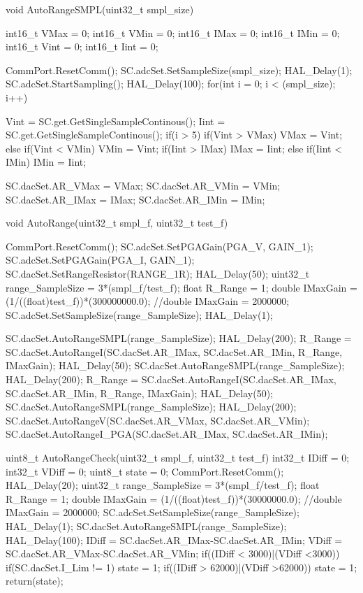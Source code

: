 void AutoRangeSMPL(uint32_t smpl_size) {
	  int16_t VMax = 0;
	  int16_t VMin = 0;
	  int16_t IMax = 0;
	  int16_t IMin = 0;
	  int16_t Vint = 0;
	  int16_t Iint = 0;

	  CommPort.ResetComm();
	  SC.adcSet.SetSampleSize(smpl_size);
	  HAL_Delay(1);
	  SC.adcSet.StartSampling();
	  HAL_Delay(100);
	  for(int i = 0; i < (smpl_size); i++) {
		  Vint = SC.get.GetSingleSampleContinous();
		  Iint = SC.get.GetSingleSampleContinous();
		  if(i > 5) {
			  if(Vint > VMax) {
				  VMax = Vint;
			  }
			  else if(Vint < VMin) {
				  VMin = Vint;
			  }
			  if(Iint > IMax) {
				  IMax = Iint;
			  }
			  else if(Iint < IMin) {
				  IMin = Iint;
			  }
		  }

	  }
	  SC.dacSet.AR_VMax = VMax;
	  SC.dacSet.AR_VMin = VMin;
	  SC.dacSet.AR_IMax = IMax;
	  SC.dacSet.AR_IMin = IMin;


}

void AutoRange(uint32_t smpl_f, uint32_t test_f) {
	  CommPort.ResetComm();
	  SC.adcSet.SetPGAGain(PGA_V, GAIN_1);
	  SC.adcSet.SetPGAGain(PGA_I, GAIN_1);
	  SC.dacSet.SetRangeResistor(RANGE_1R);
	  HAL_Delay(50);
	  uint32_t range_SampleSize = 3*(smpl_f/test_f);
	  float R_Range = 1;
	  double IMaxGain = (1/((float)test_f))*(300000000.0);
	  //double IMaxGain = 2000000;
	  SC.adcSet.SetSampleSize(range_SampleSize);
	  HAL_Delay(1);

	  SC.dacSet.AutoRangeSMPL(range_SampleSize);
	  HAL_Delay(200);
	  R_Range = SC.dacSet.AutoRangeI(SC.dacSet.AR_IMax, SC.dacSet.AR_IMin, R_Range, IMaxGain);
	  HAL_Delay(50);
	  SC.dacSet.AutoRangeSMPL(range_SampleSize);
	  HAL_Delay(200);
	  R_Range = SC.dacSet.AutoRangeI(SC.dacSet.AR_IMax, SC.dacSet.AR_IMin, R_Range, IMaxGain);
	  HAL_Delay(50);
	  SC.dacSet.AutoRangeSMPL(range_SampleSize);
	  HAL_Delay(200);
	  SC.dacSet.AutoRangeV(SC.dacSet.AR_VMax, SC.dacSet.AR_VMin);
	  SC.dacSet.AutoRangeI_PGA(SC.dacSet.AR_IMax, SC.dacSet.AR_IMin);
}

uint8_t AutoRangeCheck(uint32_t smpl_f, uint32_t test_f) {
	int32_t IDiff = 0;
	int32_t VDiff = 0;
	uint8_t state = 0;
	CommPort.ResetComm();
	HAL_Delay(20);
	uint32_t range_SampleSize = 3*(smpl_f/test_f);
	float R_Range = 1;
	double IMaxGain = (1/((float)test_f))*(30000000.0);
	//double IMaxGain = 2000000;
	SC.adcSet.SetSampleSize(range_SampleSize);
	HAL_Delay(1);
	SC.dacSet.AutoRangeSMPL(range_SampleSize);
	HAL_Delay(100);
	IDiff = SC.dacSet.AR_IMax-SC.dacSet.AR_IMin;
	VDiff = SC.dacSet.AR_VMax-SC.dacSet.AR_VMin;
	if((IDiff < 3000)|(VDiff <3000)) {
		if(SC.dacSet.I_Lim != 1) {
			state = 1;
		}
	}
	if((IDiff > 62000)|(VDiff >62000)) {
		state = 1;
	}
	return(state);
}


